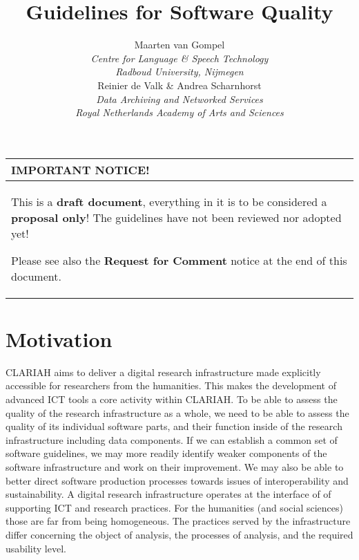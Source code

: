 \documentclass[a4paper,11pt]{article}
\newcommand{\subtitle}[1]{%
  \posttitle{%
    \par\end{center}
    \begin{center}\large#1\end{center}
    \vskip0.5em}%
}
\newenvironment{notice}{
\begin{center}
    \begin{tabular}[h!]{|p{0.8\textwidth}|}
    \hline
    {\bf IMPORTANT NOTICE!}\\\hline}
{   \\\hline
    \end{tabular}
\end{center}}
\begin{document}
\title{Guidelines for Software Quality}
\subtitle{CLARIAH Task 54.100} 
\author{Maarten van Gompel \\ \emph{Centre for Language \& Speech Technology} \\
\emph{Radboud University, Nijmegen} \\  Reinier de Valk \& Andrea Scharnhorst
\\ \emph{Data Archiving and Networked Services} \\ \emph{Royal Netherlands Academy of Arts and Sciences}}


\maketitle

\begin{notice} 
This is a \textbf{draft document}, everything in it is to be considered a
\textbf{proposal only}! The guidelines have not been reviewed nor adopted yet!

Please see also the \textbf{Request for Comment} notice at the end of this document.
\end{notice}

\tableofcontents

\section{Motivation}

CLARIAH aims to deliver a digital research infrastructure made explicitly
accessible for researchers from the humanities. This makes the development of
advanced ICT tools a core activity within CLARIAH. To be able to assess the
quality of the research infrastructure as a whole, we need to be able to assess
the quality of its individual software parts, and their function inside of the
research infrastructure including data components. If we can establish a common
set of software guidelines, we may more readily identify weaker components of
the software infrastructure and work on their improvement. We may also be able
to better direct software production processes towards issues of
interoperability and sustainability.  A digital research infrastructure
operates at the interface of of supporting ICT and research practices. For the
humanities (and social sciences) those are far from being homogeneous. The
practices served by the infrastructure differ concerning the object of
analysis, the processes of analysis, and the required usability level. 
\end{document}
